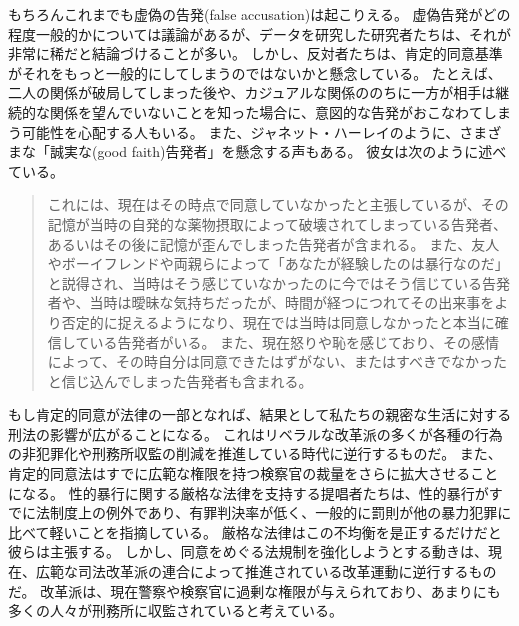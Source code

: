 \documentclass[paper=a4,book,openany]{jlreq} \usepackage{mystyle}
\begin{document}
もちろんこれまでも虚偽の告発(false accusation)は起こりえる。
虚偽告発がどの程度一般的かについては議論があるが、データを研究した研究者たちは、それが非常に稀だと結論づけることが多い\citep{ferguson16:_asses_polic_class_sexual_assaul_repor}。
しかし、反対者たちは、肯定的同意基準がそれをもっと一般的にしてしまうのではないかと懸念している。
たとえば、二人の関係が破局してしまった後や、カジュアルな関係ののちに一方が相手は継続的な関係を望んでいないことを知った場合に、意図的な告発がおこなわてしまう可能性を心配する人もいる。
また、ジャネット・ハーレイのように、さまざまな「誠実な(good faith)告発者」を懸念する声もある。
彼女は次のように述べている。

\begin{quote}
これには、現在はその時点で同意していなかったと主張しているが、その記憶が当時の自発的な薬物摂取によって破壊されてしまっている告発者、あるいはその後に記憶が歪んでしまった告発者が含まれる。
また、友人やボーイフレンドや両親らによって「あなたが経験したのは暴行なのだ」と説得され、当時はそう感じていなかったのに今ではそう信じている告発者や、当時は曖昧な気持ちだったが、時間が経つにつれてその出来事をより否定的に捉えるようになり、現在では当時は同意しなかったと本当に確信している告発者がいる。
また、現在怒りや恥を感じており、その感情によって、その時自分は同意できたはずがない、またはすべきでなかったと信じ込んでしまった告発者も含まれる。
\citep[p.272]{halley16:_move_affir_consen}
\end{quote}

もし肯定的同意が法律の一部となれば、結果として私たちの親密な生活に対する刑法の影響が広がることになる。
これはリベラルな改革派の多くが各種の行為の非犯罪化や刑務所収監の削減を推進している時代に逆行するものだ。
また、肯定的同意法はすでに広範な権限を持つ検察官の裁量をさらに拡大させることになる。
性的暴行に関する厳格な法律を支持する提唱者たちは、性的暴行がすでに法制度上の例外であり、有罪判決率が低く、一般的に罰則が他の暴力犯罪に比べて軽いことを指摘している。
厳格な法律はこの不均衡を是正するだけだと彼らは主張する。
しかし、同意をめぐる法規制を強化しようとする動きは、現在、広範な司法改革派の連合によって推進されている改革運動に逆行するものだ。
改革派は、現在警察や検察官に過剰な権限が与えられており、あまりにも多くの人々が刑務所に収監されていると考えている。
\end{document}
